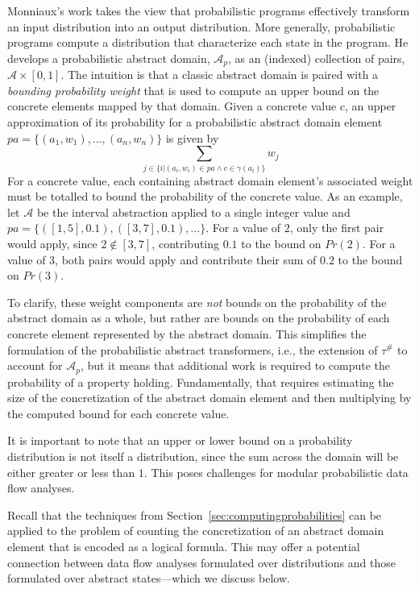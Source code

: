 Monniaux's work takes the view that probabilistic programs 
effectively transform an input distribution into an output
distribution.  More generally, probabilistic programs compute a distribution that
characterize each state in the program.   
He develops a probabilistic abstract domain, $\mathcal{A}_p$, 
as an (indexed) collection of pairs, $\mathcal{A} \times [0,1]$.
The intuition is that a classic abstract domain is paired
with a \textit{bounding probability weight} that is used
to compute an upper bound on the concrete elements mapped
by that domain.
Given a concrete value $c$, 
an upper approximation of its probability 
for a probabilistic abstract domain
element $pa = \{(a_1,w_1), ..., (a_n,w_n)\}$
is given by
\[
\sum_{j \in \{ i \vert (a_i,w_i) \in pa \wedge c \in \gamma(a_i)\}} w_j
\]
For a concrete value, each containing abstract
domain element's associated weight must be totalled
to bound the probability of the concrete value.
As an example, let $\mathcal{A}$ be the interval abstraction
applied to a single integer value
and $pa = \{([1,5],0.1),([3,7],0.1),\ldots\}$.  
For a value of $2$, only the first pair would apply, since
$2 \not\in [3,7]$, contributing $0.1$ to the bound on $Pr(2)$.
For a value of $3$, both pairs would apply and contribute
their sum of $0.2$ to the bound on $Pr(3)$.

To clarify, these weight components are \textit{not} bounds on the probability
of the abstract domain as a whole, but rather are bounds on the probability
of each concrete element represented by the abstract domain.
This simplifies the formulation of the probabilistic abstract
transformers, i.e., the extension of $\tau^\#$ to account for 
$\mathcal{A}_p$, but it means that additional
work is required to compute the probability of a property holding.
Fundamentally, that requires estimating the size of the concretization
of the abstract domain element and then multiplying by the computed bound for
each concrete value.  

It is important to note that an upper or lower
bound on a probability distribution
is not itself a distribution, since the sum across the domain
will be either greater or less than $1$.
This poses challenges for modular probabilistic data flow analyses.

Recall that the techniques from 
Section~\ref{sec:computingprobabilities} can be applied to
the problem of counting the concretization of an abstract domain element 
that is encoded as a logical formula.  This may offer a potential
connection between data flow analyses formulated over distributions
and those formulated over abstract states---which we discuss below.


